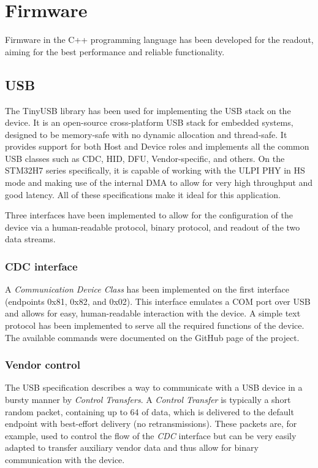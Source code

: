 \chapter{Firmware}
Firmware in the C++ programming language has been developed for the readout, aiming for the best performance and reliable functionality. 
\section{USB}
The TinyUSB library has been used for implementing the USB stack on the device. It is an open-source cross-platform USB stack for embedded systems, designed to be memory-safe with no dynamic allocation and thread-safe. It provides support for both Host and Device roles and implements all the common USB classes such as CDC, HID, DFU, Vendor-specific, and others. On the STM32H7 series specifically, it is capable of working with the ULPI PHY in HS mode and making use of the internal DMA to allow for very high throughput and good latency. All of these specifications make it ideal for this application.

Three interfaces have been implemented to allow for the configuration of the device via a human-readable protocol, binary protocol, and readout of the two data streams.
\subsection{CDC interface}
A \emph{Communication Device Class} has been implemented on the first interface (endpoints 0x81, 0x82, and 0x02). This interface emulates a COM port over USB and allows for easy, human-readable interaction with the device. A simple text protocol has been implemented to serve all the required functions of the device. The available commands were documented on the GitHub page of the project.

\subsection{Vendor control}
The USB specification describes a way to communicate with a USB device in a bursty manner by \emph{Control Transfers}. A \emph{Control Transfer} is typically a short random packet, containing up to \SI{64}{\byte} of data, which is delivered to the default endpoint with best-effort delivery (no retransmissions). These packets are, for example, used to control the flow of the \emph{CDC} interface but can be very easily adapted to transfer auxiliary vendor data and thus allow for binary communication with the device. 

